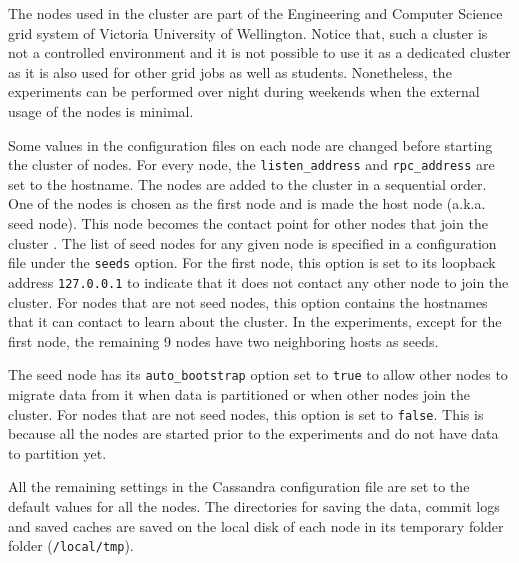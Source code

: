  


The nodes used in the cluster are part of the Engineering and Computer Science
grid system of Victoria University of Wellington. Notice that, such a cluster is
not a controlled environment and it is not possible to use it as  a dedicated cluster as it is also used for other grid
jobs as well as students. Nonetheless, the experiments can be performed over
night during weekends when the external usage of the nodes is minimal.

Some values in the configuration files on each node are changed before starting
the cluster of nodes.  For every node,  the \texttt{listen\_address} and
\texttt{rpc\_address} are set to the hostname.  The nodes are added to the
cluster in a sequential order.  One of the nodes is chosen as the first node and
is made the host node (a.k.a. seed node).
This node becomes the contact point for other nodes that join the cluster
.
The list of seed nodes for any given node is specified in a configuration file
under the \texttt{seeds} option.  For the
 first node,  this option is set to its loopback address \texttt{127.0.0.1} to
 indicate that it does not contact any other node to join the cluster.  For
 nodes that are not seed nodes, this option contains the hostnames that it can
contact to learn about the cluster.  In the experiments,  except for the first
node, the remaining 9 nodes have two neighboring hosts  as seeds.

The seed node has its \texttt{auto\_bootstrap} option set to \texttt{true} to
allow other nodes to migrate data from it when data is partitioned or when other
nodes join the cluster.  For nodes that are not seed nodes,  this option is set
to \texttt{false}.  This is because all the nodes are started prior to the 
experiments and do not have data to partition yet. 
 

All the remaining
settings in the Cassandra configuration file are set to the  default values
for all the nodes.  The directories for saving the data,  commit logs and saved
caches are saved on the local disk of each node in its temporary
folder folder (\texttt{/local/tmp}).









